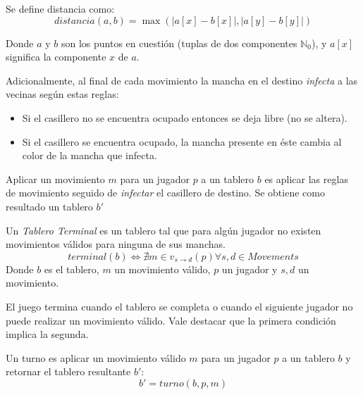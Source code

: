 \documentclass[10pt,a4paper,notitlepage,draft]{article}
\newenvironment{definition}[1][Definición]{\begin{trivlist}
\item[\hskip \labelsep {\bfseries #1}]}{\end{trivlist}}
\begin{document}
\begin{definition}
Se define distancia como:
\begin{equation}
    distancia(a, b) = \max(|a[x] - b[x]|, |a[y] - b[y]|)
\end{equation}

Donde $a$ y $b$ son los puntos en cuestión (tuplas de dos componentes $\mathbb{N}_{0}$), y $a[x]$ significa la componente $x$ de $a$.
\end{definition}

Adicionalmente, al final de cada movimiento la mancha en el destino \textit{infecta} a las vecinas según estas reglas:
\begin{itemize}
\item Si el casillero no se encuentra ocupado entonces se deja libre (no se altera).
\item Si el casillero se encuentra ocupado, la mancha presente en éste cambia al color de la mancha que infecta.
\end{itemize}

\begin{definition}
Aplicar un movimiento $m$ para un jugador $p$ a un tablero $b$ es aplicar las reglas de movimiento seguido de \textit{infectar} el casillero de destino. Se obtiene como resultado un tablero $b'$
\end{definition}

\begin{definition}
Un \textit{Tablero Terminal} es un tablero tal que para algún jugador no existen movimientos válidos para ninguna de sus manchas.
\begin{equation}
terminal(b) \Leftrightarrow \nexists m \in v_{s \rightarrow d}(p) \forall s, d \in Movements
\end{equation}
Donde $b$ es el tablero, $m$ un movimiento válido, $p$ un jugador y $s, d$ un movimiento.
\end{definition}

El juego termina cuando el tablero se completa o cuando el siguiente jugador no puede realizar un movimiento válido. Vale destacar que la primera condición implica la segunda.

\begin{definition}
Un turno es aplicar un movimiento válido $m$ para un jugador $p$ a un tablero $b$ y retornar el tablero resultante $b'$:
\begin{equation}
b' = turno(b, p, m)
\end{equation}
\end{definition}
\end{document}
